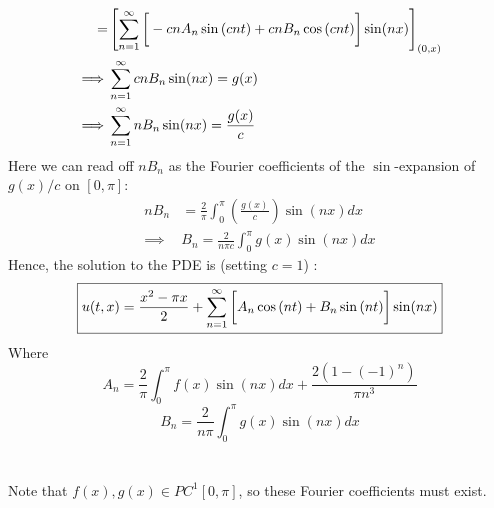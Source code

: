 \documentclass[12pt]{article}
\begin{document}
{\begin{align*}
=& \left[ \sum_{n=1}^{\infty} \left[  \vphantom{\frac{1}{1}} -cn A_n \sin \left( cnt \right) + cn B_n \cos \left( cnt \right) \right] \sin(nx) \right]_{(0,x)} \\
\implies& \sum_{n=1}^{\infty} cn B_n \sin(nx) = g(x) \\
\implies& \sum_{n=1}^{\infty} n B_n \sin(nx) = \frac{g(x)}{c}
\end{align*}
Here we can read off $nB_n$ as the Fourier coefficients of the $\sin$-expansion of $g(x)/c$ on $[0,\pi]$:
\begin{align*}
nB_n &= \frac{2}{\pi} \int_0^{\pi} \left( \frac{g(x)}{c} \right) \sin(nx) dx \\ 
\implies&  B_n = \frac{2}{n\pi c} \int_0^{\pi} g(x) \sin(nx) dx
\end{align*}
Hence, the solution to the PDE is (setting $c=1$) :
\begin{align*}
\boxed{u(t,x) = \frac{x^2 - \pi x}{2}+ \sum_{n=1}^{\infty} \left[  \vphantom{\frac{1}{1}} A_n \cos \left(nt \right) + B_n \sin \left( nt \right) \right] \sin(nx)}
\end{align*}
Where 
$$\boxed{A_n = \frac{2}{\pi} \int_{0}^{\pi} f(x) \sin(nx) dx + \frac{2(1 - (-1)^n)}{\pi n^3}}$$
$$\boxed{B_n = \frac{2}{n\pi} \int_0^{\pi} g(x) \sin(nx) dx}$$ \\ \\
Note that $f(x),g(x) \in PC^1[0,\pi]$, so these Fourier coefficients must exist.
}
\end{document}
